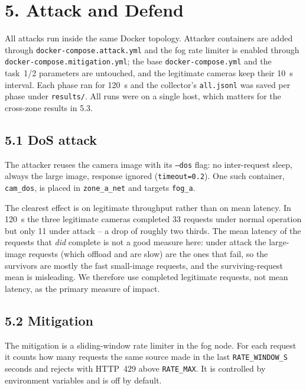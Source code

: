 
\section*{5. Attack and Defend}

All attacks run inside the same Docker topology. Attacker containers are
added through \texttt{docker-compose.attack.yml} and the fog rate limiter
is enabled through \texttt{docker-compose.mitigation.yml}; the base
\texttt{docker-compose.yml} and the task~1/2 parameters are untouched, and
the legitimate cameras keep their 10~s interval. Each phase ran for 120~s
and the collector's \texttt{all.jsonl} was saved per phase under
\texttt{results/}. All runs were on a single host, which matters for the
cross-zone results in 5.3.

\subsection*{5.1 DoS attack}

The attacker reuses the camera image with its \texttt{--dos} flag: no
inter-request sleep, always the large image, response ignored
(\texttt{timeout=0.2}). One such container, \texttt{cam\_dos}, is placed in
\texttt{zone\_a\_net} and targets \texttt{fog\_a}.

The clearest effect is on legitimate throughput rather than on mean
latency. In 120~s the three legitimate cameras completed 33 requests under
normal operation but only 11 under attack -- a drop of roughly two thirds.
The mean latency of the requests that \emph{did} complete is not a good
measure here: under attack the large-image requests (which offload and are
slow) are the ones that fail, so the survivors are mostly the fast
small-image requests, and the surviving-request mean is misleading. We
therefore use completed legitimate requests, not mean latency, as the
primary measure of impact.

\subsection*{5.2 Mitigation}

The mitigation is a sliding-window rate limiter in the fog node. For each
request it counts how many requests the same source made in the last
\texttt{RATE\_WINDOW\_S} seconds and rejects with HTTP~429 above
\texttt{RATE\_MAX}. It is controlled by environment variables and is off by
default.

